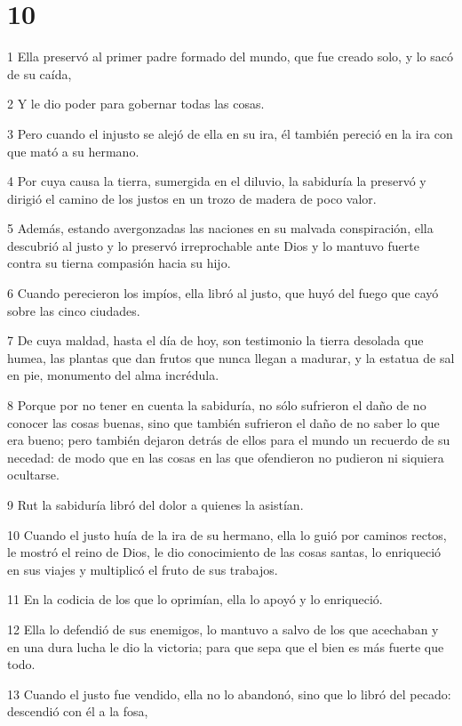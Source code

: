 \chapter{10}

\par 1 Ella preservó al primer padre formado del mundo, que fue creado solo, y lo sacó de su caída,
\par 2 Y le dio poder para gobernar todas las cosas.
\par 3 Pero cuando el injusto se alejó de ella en su ira, él también pereció en la ira con que mató a su hermano.
\par 4 Por cuya causa la tierra, sumergida en el diluvio, la sabiduría la preservó y dirigió el camino de los justos en un trozo de madera de poco valor.
\par 5 Además, estando avergonzadas las naciones en su malvada conspiración, ella descubrió al justo y lo preservó irreprochable ante Dios y lo mantuvo fuerte contra su tierna compasión hacia su hijo.
\par 6 Cuando perecieron los impíos, ella libró al justo, que huyó del fuego que cayó sobre las cinco ciudades.
\par 7 De cuya maldad, hasta el día de hoy, son testimonio la tierra desolada que humea, las plantas que dan frutos que nunca llegan a madurar, y la estatua de sal en pie, monumento del alma incrédula.
\par 8 Porque por no tener en cuenta la sabiduría, no sólo sufrieron el daño de no conocer las cosas buenas, sino que también sufrieron el daño de no saber lo que era bueno; pero también dejaron detrás de ellos para el mundo un recuerdo de su necedad: de modo que en las cosas en las que ofendieron no pudieron ni siquiera ocultarse.
\par 9 Rut la sabiduría libró del dolor a quienes la asistían.
\par 10 Cuando el justo huía de la ira de su hermano, ella lo guió por caminos rectos, le mostró el reino de Dios, le dio conocimiento de las cosas santas, lo enriqueció en sus viajes y multiplicó el fruto de sus trabajos.
\par 11 En la codicia de los que lo oprimían, ella lo apoyó y lo enriqueció.
\par 12 Ella lo defendió de sus enemigos, lo mantuvo a salvo de los que acechaban y en una dura lucha le dio la victoria; para que sepa que el bien es más fuerte que todo.
\par 13 Cuando el justo fue vendido, ella no lo abandonó, sino que lo libró del pecado: descendió con él a la fosa,
